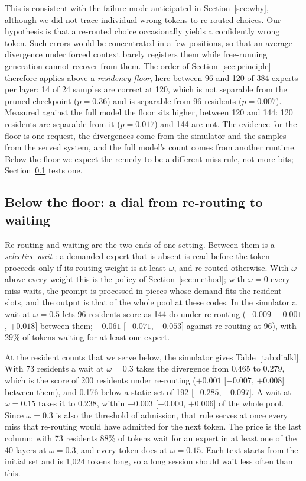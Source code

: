 \documentclass[11pt]{article}
\newcommand{\ci}[2]{[$#1$, $#2$]}
\begin{document}
This is consistent with the failure mode anticipated in Section~\ref{sec:why}, although we did not trace individual wrong tokens to re-routed choices. Our hypothesis is that a re-routed choice occasionally yields a confidently wrong token. Such errors would be concentrated in a few positions, so that an average divergence under forced context barely registers them while free-running generation cannot recover from them. The order of Section~\ref{sec:principle} therefore applies above a \emph{residency floor}, here between 96 and 120 of 384 experts per layer: 14 of 24 samples are correct at 120, which is not separable from the pruned checkpoint ($p=0.36$) and is separable from 96 residents ($p=0.007$). Measured against the full model the floor sits higher, between 120 and 144: 120 residents are separable from it ($p=0.017$) and 144 are not. The evidence for the floor is one request, the divergences come from the simulator and the samples from the served system, and the full model's count comes from another runtime. Below the floor we expect the remedy to be a different miss rule, not more bits; Section~\ref{sec:dial} tests one.

\FloatBarrier
\subsection{Below the floor: a dial from re-routing to waiting}
\label{sec:dial}

Re-routing and waiting are the two ends of one setting. Between them is a \emph{selective wait}
\citep{son2026misses}: a demanded expert that is absent is read before the token proceeds only if
its routing weight is at least $\omega$, and re-routed otherwise. With $\omega$ above every weight
this is the policy of Section~\ref{sec:method}; with $\omega=0$ every miss waits, the prompt is
processed in pieces whose demand fits the resident slots, and the output is that of the whole pool
at these codes. In the simulator a wait at $\omega=0.5$ lets 96 residents score as 144 do under
re-routing ($+0.009$ \ci{-0.001}{+0.018} between them; $-0.061$ \ci{-0.071}{-0.053} against
re-routing at 96), with 29\% of tokens waiting for at least one expert.

At the resident counts that we serve below, the simulator gives Table~\ref{tab:dialkl}. With 73
residents a wait at $\omega=0.3$ takes the divergence from 0.465 to 0.279, which is the score of 200
residents under re-routing ($+0.001$ \ci{-0.007}{+0.008} between them), and 0.176 below a static
set of 192 \ci{-0.285}{-0.097}. A wait at $\omega=0.15$ takes it to 0.238, within $+0.003$
\ci{-0.000}{+0.006} of the whole pool. Since $\omega=0.3$ is also the threshold of admission, that
rule serves at once every miss that re-routing would have admitted for the next token. The price is
the last column: with 73 residents 88\% of tokens wait for an expert in at least one of the 40
layers at $\omega=0.3$, and every token does at $\omega=0.15$. Each text starts from the initial
set and is 1,024 tokens long, so a long session should wait less often than this.
\end{document}
